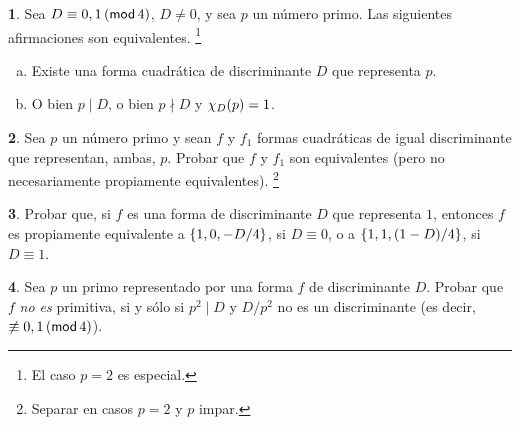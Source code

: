 \theoremstyle{definition}
\newtheorem{ejerRepresentaciones}{\ejername}[section]


\begin{ejerRepresentaciones}\label{ejer:representaciones:kronecker}
	Sea $D\equiv 0,1\tmodulo[4]$, $D\neq 0$, y sea $p$
	un n\'umero primo. Las siguientes afirmaciones
	son equivalentes.%
	\footnote{
		El caso $p=2$ es especial.
	}
	\begin{enumerate}[(a)]
		\item\label{item:ejer:representaciones:kronecker:representable}
			Existe una forma cuadr\'atica de discriminante
			$D$ que representa $p$.
		\item\label{item:ejer:representaciones:kronecker:nucleo}
			O bien $p\mid D$, o bien $p\nmid D$ y
			$\varkronecker[D](p)=1$.
	\end{enumerate}
\end{ejerRepresentaciones}

\begin{ejerRepresentaciones}\label{ejer:representaciones:equivalentes:primo}
	Sea $p$ un n\'umero primo y sean $f$ y $f_1$ formas
	cuadr\'aticas de igual discriminante que representan,
	ambas, $p$. Probar que $f$ y $f_1$ son equivalentes
	(pero no necesariamente propiamente equivalentes).%
	\footnote{
		Separar en casos $p=2$ y $p$ impar.
	}
\end{ejerRepresentaciones}

\begin{ejerRepresentaciones}\label{ejer:representaciones:equivalentes:uno}
	Probar que, si $f$ es una forma de discriminante $D$ que
	representa $1$, entonces $f$ es propiamente equivalente a
	$\binaria{1,0,-D/4}$, si $D\equiv 0$, o a
	$\binaria{1,1,(1-D)/4}$, si $D\equiv 1$.%
\end{ejerRepresentaciones}

\begin{ejerRepresentaciones}
	Sea $p$ un primo representado por una forma $f$ de discriminante
	$D$. Probar que $f$ \emph{no es} primitiva, si y s\'olo si
	$p^2\mid D$ y $D/p^2$ no es un discriminante
	(es decir, $\not\equiv 0,1\tmodulo[4]$).
\end{ejerRepresentaciones}


